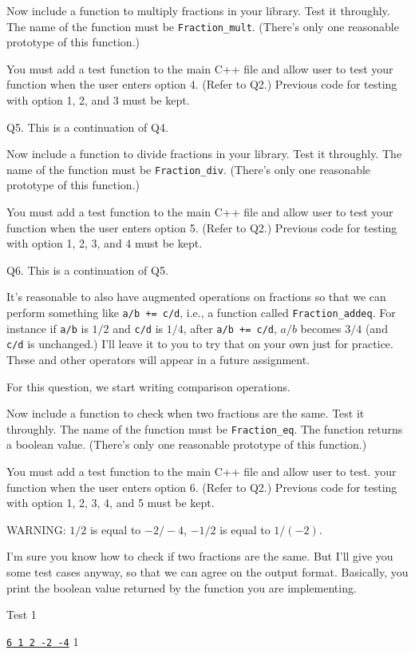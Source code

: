 Now include a function to multiply fractions in your library.
Test it throughly.
The name of the function must be \verb!Fraction_mult!.
(There's only one reasonable prototype of this function.)

You must add a test function to the main C++ file and allow user to test
your function when the user enters option 4. (Refer to Q2.)
Previous code for testing with option 1, 2, and 3 must be kept.


\newpage
Q5. This is a continuation of Q4.

Now include a function to divide fractions in your library.
Test it throughly.
The name of the function must be \verb!Fraction_div!.
(There's only one reasonable prototype of this function.)

You must add a test function to the main C++ file and allow user to test
your function when the user enters option 5. (Refer to Q2.)
Previous code for testing with option 1, 2, 3, and 4 must be kept.


\newpage
Q6.
This is a continuation of Q5.

It's reasonable to also have augmented operations on fractions so that
we can perform something like \verb!a/b += c/d!, i.e., a function
called \verb!Fraction_addeq!.
For instance if \verb!a/b! is $1/2$ and \verb!c/d! is $1/4$,
after \verb!a/b += c/d!, $a/b$ becomes $3/4$ (and \verb!c/d! is unchanged.)
I'll leave it to you to try that on your own just for practice.
These and other operators will appear in a future assignment.

For this question, we start writing comparison operations.

Now include a function to check when two fractions are the same.
Test it throughly.
The name of the function must be \verb!Fraction_eq!.
The function returns a boolean value.
(There's only one reasonable prototype of this function.)

You must add a test function to the main C++ file and allow user to test.
your function when the user enters option 6. (Refer to Q2.)
Previous code for testing with option 1, 2, 3, 4, and 5 must be kept.


WARNING: $1/2$ is equal to $-2/-4$, $-1/2$ is equal to $1/(-2)$.

I'm sure you know how to check if two fractions are the same.
But I'll give you some test cases anyway, so that we can agree on the
output format. Basically, you print the boolean value returned by the
function you are implementing.

Test 1
\begin{console}[commandchars=\\\{\}]
\underline{\texttt{6 1 2 -2 -4}}
1
\end{console}

